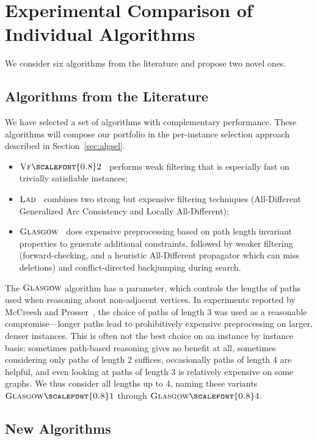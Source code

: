 \documentclass{llncs}
\newcommand{\VFtwo}{$\textsc{Vf{\scalefont{0.8}2}}$\xspace}
\newcommand{\Glasgow}{$\textsc{Glasgow}$\xspace}
\newcommand{\LAD}{$\textsc{Lad}$\xspace}
\newcommand{\GlasgowOne}{$\textsc{Glasgow{\scalefont{0.8}1}}$\xspace}
\newcommand{\GlasgowFour}{$\textsc{Glasgow{\scalefont{0.8}4}}$\xspace}
\begin{document}
\section{Experimental Comparison of Individual Algorithms}\label{sec:exps}

We consider six algorithms from the literature and propose two novel ones.

\subsection{Algorithms from the Literature}

We have selected a set of algorithms with complementary performance. These
algorithms will compose our portfolio in the per-instance selection approach
described in Section~\ref{sec:algsel}.
\begin{itemize}
\item \VFtwo{}~\cite{Cordella:2004} performs weak filtering that is especially fast on
    trivially satisfiable instances;
\item \LAD{}~\cite{Solnon:2010} combines two strong but expensive filtering techniques
    (All-Different Generalized Arc Consistency and Locally All-Different);
\item \Glasgow{}~\cite{McCreesh:2015} does expensive preprocessing based on path length
    invariant properties to generate additional constraints, followed by weaker filtering
    (forward-checking, and a heuristic All-Different propagator which can miss deletions) and
    conflict-directed backjumping during search.
\end{itemize}

\noindent The \Glasgow algorithm has a parameter, which controls the lengths of paths used when
reasoning about non-adjacent vertices.  In experiments reported by McCreesh and
Prosser~\cite{McCreesh:2015}, the choice of paths of length 3 was used as a reasonable compromise---longer
paths lead to prohibitively expensive preprocessing on larger, denser instances. This is often not
the best choice on an instance by instance basis: sometimes path-based reasoning gives no benefit at
all, sometimes considering only paths of length 2 suffices, occasionally paths of length 4 are
helpful, and even looking at paths of length 3 is relatively expensive on some graphs. We thus consider all
lengths up to 4, naming these variants \GlasgowOne through \GlasgowFour.

\subsection{New Algorithms}
\end{document}
